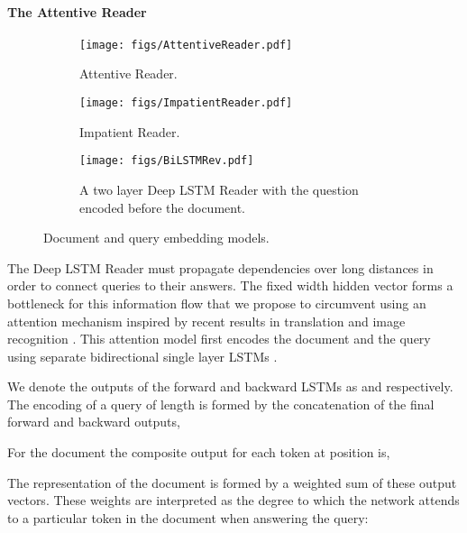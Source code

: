 \documentclass{article}
\begin{document}
\paragraph{The Attentive Reader}

\newcommand{\attnIn}{m}
\newcommand{\attnU}{u}
\newcommand{\attnOver}{y}
\newcommand{\attnMix}{r}
\newcommand{\attnMid}{z}
\newcommand{\attnScore}{s}
\newcommand{\fwd}[1]{\overrightarrow{#1}}
\newcommand{\back}[1]{\overleftarrow{#1}}
\newcommand{\softmax}[2]{\frac{\exp\left(#1\right)}{#2}}

\begin{figure}
\centering
  \begin{subfigure}[b]{0.49\textwidth}
    \centering
    \texttt{[image: figs/AttentiveReader.pdf]}
    \caption{Attentive Reader.}
  \end{subfigure}
  \begin{subfigure}[b]{0.49\textwidth}
    \centering
    \texttt{[image: figs/ImpatientReader.pdf]}
    \caption{Impatient Reader.}
  \end{subfigure}
  \begin{subfigure}[b]{1.0\textwidth}
    \centering
\texttt{[image: figs/BiLSTMRev.pdf]}
    \caption{A two layer Deep LSTM Reader with the question encoded before
             the document.}
  \end{subfigure}
  \caption{Document and query embedding models.}
\label{fig:models}
\end{figure}

The Deep LSTM Reader must propagate dependencies over long distances in order to
connect queries to their answers. The fixed width hidden vector forms a
bottleneck for this information flow that we propose to circumvent using an
attention mechanism inspired by recent results in translation and image
recognition \cite{Bahdanau:2014:NMT,Mnih:2014:RMVA}.
This attention model first encodes the document and the query using separate
bidirectional single layer LSTMs \cite{Graves:2012:SSLRNN}.

We denote the
outputs of the forward and backward LSTMs as  and 
respectively.  The encoding  of a query of length  is formed by the
concatenation of the final forward and backward outputs,


For the document the composite output for each token at position  is,

The representation  of the document  is formed by a weighted sum of these
output vectors. These weights are interpreted as the degree to which the network
attends to a particular token in the document when answering the query:
\end{document}
